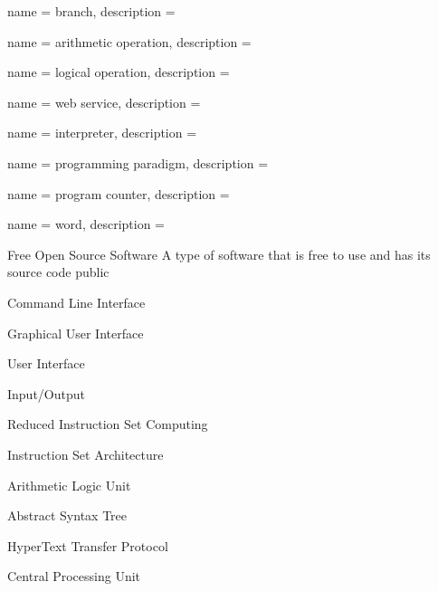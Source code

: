  {
  name = {branch},
  description = {}
}

 {
  name = {arithmetic operation},
  description = {}
}

 {
  name = {logical operation},
  description = {}
}

 {
  name = {web service},
  description = {}
}

 {
  name = {interpreter},
  description = {}
}

 {
  name = {programming paradigm},
  description = {}
}

 {
  name = {program counter},
  description = {}
}

 {
  name = {word},
  description = {}
}


{Free Open Source Software}
{A type of software that is free to use and has its source code public}

{Command Line Interface}
{}

{Graphical User Interface}
{}

{User Interface}
{}


{Input/Output}
{}

{Reduced Instruction Set Computing}
{}

{Instruction Set Architecture}
{}

{Arithmetic Logic Unit}
{}

{Abstract Syntax Tree}
{}

{HyperText Transfer Protocol}
{}

{Central Processing Unit}
{}


